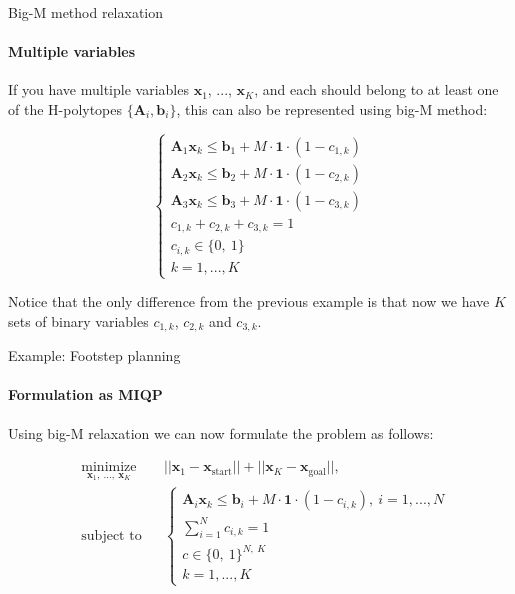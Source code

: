 \documentclass{beamer}
\begin{document}
\begin{frame}{Big-M method relaxation}
\framesubtitle{Multiple variables}
\begin{flushleft}

If you have multiple variables $\mathbf{x}_1$, ..., $\mathbf{x}_K$, and each should belong to at least one of the H-polytopes $\{ \mathbf{A}_i, \mathbf{b}_i\}$, this can also be represented using big-M method:

\begin{equation}
    \begin{cases}
    \mathbf{A}_1 \mathbf{x}_k \leq \mathbf{b}_1 + M \cdot \mathbf{1} \cdot (1 - c_{1, k}) \\
    \mathbf{A}_2 \mathbf{x}_k \leq \mathbf{b}_2 + M \cdot \mathbf{1} \cdot (1 - c_{2, k}) \\
    \mathbf{A}_3 \mathbf{x}_k \leq \mathbf{b}_3 + M \cdot \mathbf{1} \cdot (1 - c_{3, k}) \\
    c_{1, k} + c_{2, k} + c_{3, k} = 1 \\
    c_{i, k}  \in \{0, \ 1 \} \\
    k = 1,...,K
    \end{cases}
\end{equation}

Notice that the only difference from the previous example is that now we have $K$ sets of binary variables $c_{1, k}$,  $c_{2, k}$ and $c_{3, k}$.

\end{flushleft}
\end{frame}






\begin{frame}{Example: Footstep planning}
\framesubtitle{Formulation as MIQP}
\begin{flushleft}

Using big-M relaxation we can now formulate the problem as follows:

\begin{equation}
\begin{aligned}
& \underset{\mathbf{x}_1, \ ..., \ \mathbf{x}_K}{\text{minimize}}
& & ||\mathbf{x}_1 - \mathbf{x}_{\text{start}}|| + ||\mathbf{x}_K - \mathbf{x}_{\text{goal}}||, \\
& \text{subject to}
& & \begin{cases}
    \mathbf{A}_i \mathbf{x}_k \leq \mathbf{b}_i + M \cdot \mathbf{1} \cdot (1 - c_{i, k}), \ i = 1,...,N \\
    \sum_{i=1}^N c_{i, k} = 1 \\
    c  \in \{0, \ 1 \}^{N, \ K} \\
    k = 1,...,K
    \end{cases}
\end{aligned}
\end{equation}

 
\end{flushleft}
\end{frame}
\end{document}
